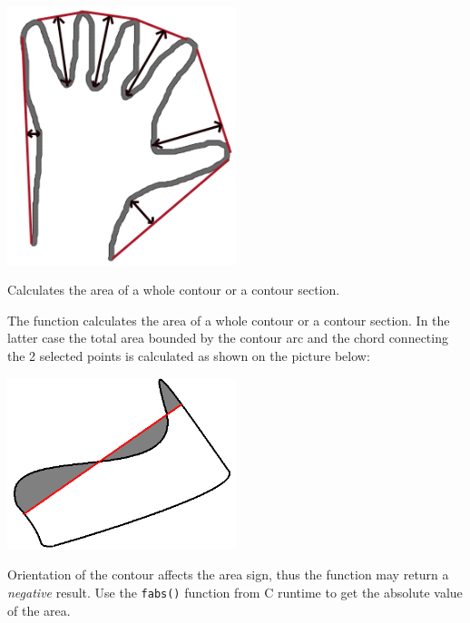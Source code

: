 \fi

\includegraphics[width=0.5\textwidth]{pics/defects.png}

Calculates the area of a whole contour or a contour section.


\begin{description}
\end{description}

The function calculates the area of a whole contour
or a contour section. In the latter case the total area bounded by the
contour arc and the chord connecting the 2 selected points is calculated
as shown on the picture below:

\includegraphics[width=0.5\textwidth]{pics/contoursecarea.png}

Orientation of the contour affects the area sign, thus the function may return a \emph{negative} result. Use the \texttt{fabs()} function from C runtime to get the absolute value of the area.


